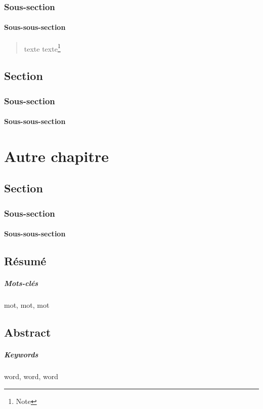 \documentclass[a4paper,11pt]{book}
\begin{document}
\subsection{Sous-section}
\subsubsection{Sous-sous-section}
\kant
\begin{quote}
\kant[1]
\end{quote}

\kant[1]

\newenvironment{macitation}{\begin{quote}\singlespacing\small}{\end{quote}}

\begin{macitation}
\kant[1] texte texte\footnote{Note}
\end{macitation}

\kant[1]

\section{Section}
\subsection{Sous-section}
\subsubsection{Sous-sous-section}
\kant[5]

\chapter{Autre chapitre}
\section{Section}
\subsection{Sous-section}
\subsubsection{Sous-sous-section}
\kant


\backmatter
\tableofcontents
\listoffigures
\listoftables

\dernierepage
\section*{Résumé}
\kant[1]
\paragraph{Mots-clés} mot, mot, mot

\section*{Abstract}
\kant[1]
\paragraph{Keywords} word, word, word
\end{document}
